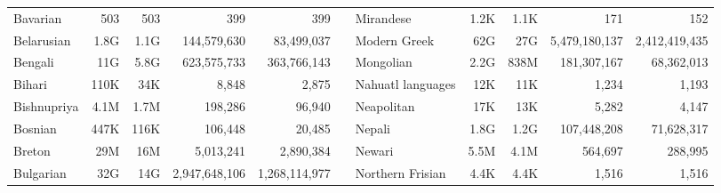 \begin{table*}[t!]
\begin{tabular}{lrrrrclrrrr}
        Bavarian                  & 503                      & 503                       & 399                      & 399                       &                          & Mirandese                 & 1.2K                     & 1.1K                      & 171                      & 152                       \\
        Belarusian                & 1.8G                     & 1.1G                      & 144,579,630              & 83,499,037                &                          & Modern Greek              & 62G                      & 27G                       & 5,479,180,137            & 2,412,419,435             \\
        Bengali                   & 11G                      & 5.8G                      & 623,575,733              & 363,766,143               &                          & Mongolian                 & 2.2G                     & 838M                      & 181,307,167              & 68,362,013                \\
        Bihari                    & 110K                     & 34K                       & 8,848                    & 2,875                     &                          & Nahuatl languages         & 12K                      & 11K                       & 1,234                    & 1,193                     \\
        Bishnupriya               & 4.1M                     & 1.7M                      & 198,286                  & 96,940                    &                          & Neapolitan                & 17K                      & 13K                       & 5,282                    & 4,147                     \\
        Bosnian                   & 447K                     & 116K                      & 106,448                  & 20,485                    &                          & Nepali                    & 1.8G                     & 1.2G                      & 107,448,208              & 71,628,317                \\
        Breton                    & 29M                      & 16M                       & 5,013,241                & 2,890,384                 &                          & Newari                    & 5.5M                     & 4.1M                      & 564,697                  & 288,995                   \\
        Bulgarian                 & 32G                      & 14G                       & 2,947,648,106            & 1,268,114,977             &                          & Northern Frisian          & 4.4K                     & 4.4K                      & 1,516                    & 1,516                     \\

\end{tabular}
\end{table*}
